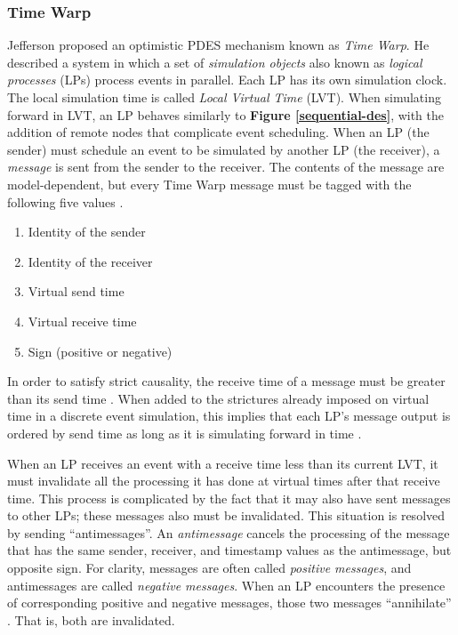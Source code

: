 \documentclass[11pt]{book}
\begin{document}
\subsubsection{\textbf{Time Warp}}
\label{time-warp}

Jefferson \cite{jefferson-85} proposed an optimistic PDES mechanism known as
\textit{Time Warp}. He described a system in which a set of \textit{simulation
  objects} also known as \textit{logical processes} (LPs) process events in
parallel. Each LP has its own simulation clock. The local simulation time is
called \textit{Local Virtual Time} (LVT). When simulating forward in LVT, an LP
behaves similarly to \textbf{Figure \ref{sequential-des}}, with the addition of
remote nodes that complicate event scheduling. When an LP (the sender) must
schedule an event to be simulated by another LP (the receiver), a
\textit{message} is sent from the sender to the receiver. The contents of the
message are model-dependent, but every Time Warp message must be tagged with the
following five values \cite{jefferson-85}.

\begin{enumerate}
  \item Identity of the sender
  \item Identity of the receiver
  \item Virtual send time
  \item Virtual receive time
  \item Sign (positive or negative)
\end{enumerate}

In order to satisfy strict causality, the receive time of a message must be
greater than its send time \cite{lamport-78}. When added to the strictures
already imposed on virtual time in a discrete event simulation, this implies
that each LP's message output is ordered by send time as long as it is
simulating forward in time \cite{jefferson-85}.

When an LP receives an event with a receive time less than its current LVT, it
must invalidate all the processing it has done at virtual times after that
receive time. This process is complicated by the fact that it may also have sent
messages to other LPs; these messages also must be invalidated. This situation
is resolved by sending ``antimessages''. An \textit{antimessage} cancels the
processing of the message that has the same sender, receiver, and timestamp
values as the antimessage, but opposite sign. For clarity, messages are often
called \textit{positive messages}, and antimessages are called \textit{negative
  messages}. When an LP encounters the presence of corresponding positive and
negative messages, those two messages ``annihilate'' \cite{jefferson-85}. That
is, both are invalidated.
\end{document}
